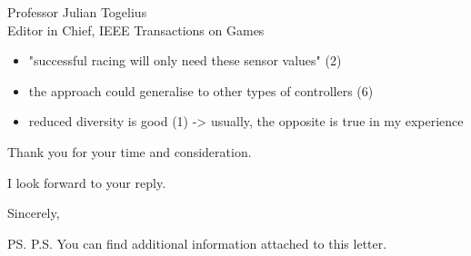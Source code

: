 \documentclass[10pt]{letter} %
\begin{document}
\begin{letter}{Professor Julian Togelius \\ Editor in Chief, IEEE Transactions on Games}
\begin{enumerate}
\begin{itemize}
\begin{itemize}
					
		\item	"successful racing will only need these sensor values" (2)
		\item	the approach could generalise to other types of controllers (6)
		\item	reduced diversity is good (1) -> usually, the opposite is true in my experience
	\end{itemize}
	
\end{itemize}
\end{enumerate}
 




Thank you for your time and consideration.

I look forward to your reply.

\vspace{2\parskip} %
\closing{Sincerely,}
\vspace{2\parskip} %

\ps{P.S. You can find additional information attached to this letter.} %



\end{letter}
 
\end{document}
